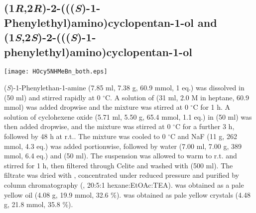 \subsection{(1\textit{R},2\textit{R})\hyp{}2\hyp{}(((\textit{S})\hyp{}1\hyp{}Phenylethyl)amino)\allowbreak cyclopentan\hyp{}1\hyp{}ol  and (1\textit{S},2\textit{S})\hyp{}2\hyp{}(((\allowbreak \textit{S})\hyp{}1\hyp{}phenylethyl)am\allowbreak ino)cyclopentan\hyp{}1\hyp{}ol }


\begin{scheme}[H]
	\begin{center}
		\texttt{[image: HOcy5NHMeBn\_both.eps]}
	\end{center}
\end{scheme}
(\textit{S})-1-Phenylethan-1-amine  (7.85 ml, 7.38 g, 60.9 mmol, 1 eq.) was dissolved in  (50 ml) and stirred rapidly at 0 $^\circ$C. A solution of  (31 ml, 2.0 M in heptane, 60.9 mmol) was added dropwise and the mixture was stirred at 0 $^\circ$C for 1 h. A solution of cyclohexene oxide  (5.71 ml, 5.50 g, 65.4 mmol, 1.1 eq.) in  (50 ml) was then added dropwise, and the mixture was stirred at 0 $^\circ$C for a further 3 h, followed by 48 h at r.t.. The mixture was cooled  to 0 $^\circ$C and NaF (11 g, 262 mmol, 4.3 eq.) was added portionwise, followed by water (7.00 ml, 7.00 g, 389 mmol, 6.4 eq.) and  (50 ml). The suspension was allowed to warm to r.t. and stirred for 1 h, then filtered through Celite and washed with  (500 ml). The filtrate was dried with , concentrated under reduced pressure and purified by column chromatography (, 20:5:1 hexane:EtOAc:TEA).  was obtained as a pale yellow oil (4.08 g, 19.9 mmol, 32.6 \%).  was obtained as pale yellow crystals (4.48 g, 21.8 mmol, 35.8 \%).

